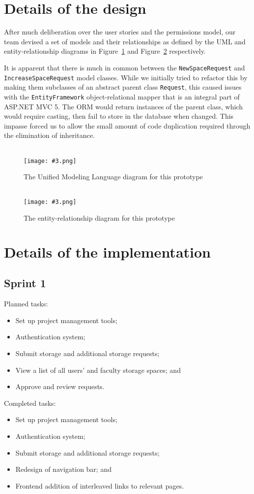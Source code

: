 \documentclass[a4paper,titlepage,12pt]{article}
\let\stdsection\section
\renewcommand\section{\newpage\stdsection}
\newcommand\figimg[4][\textwidth]{
	\begin{figure}
		\caption{#4}
		\label{fig:#2}
		\quad\\\texttt{[image: \#3.png]}
	\end{figure}
}
\begin{document}
\section{Details of the design}

After much deliberation over the user stories and the permissions model, our
team devised a set of models and their relationships as defined by the UML and
entity-relationship diagrams in Figure~\ref{fig:uml} and Figure~\ref{fig:erd}
respectively.

It is apparent that there is much in common between the
\texttt{NewSpaceRequest} and \texttt{IncreaseSpaceRequest} model classes. While
we initially tried to refactor this by making them subclasses of an abstract
parent class \texttt{Request}, this caused issues with the
\texttt{EntityFramework} object-relational mapper that is an integral part of
ASP.NET MVC 5. The ORM would return instances of the parent class, which would
require casting, then fail to store in the database when changed. This
impasse forced us to allow the small amount of code duplication required
through the elimination of inheritance.

\figimg{uml}{uml}{The Unified Modeling Language diagram for this prototype}

\figimg{erd}{erd}{The entity-relationship diagram for this prototype}

\section{Details of the implementation}

\subsection{Sprint 1}

Planned tasks:

\begin{itemize}
	\item Set up project management tools;
	\item Authentication system;
	\item Submit storage and additional storage requests;
	\item View a list of all users' and faculty storage spaces; and
	\item Approve and review requests.
\end{itemize}

Completed tasks:

\begin{itemize}
	\item Set up project management tools;
	\item Authentication system;
	\item Submit storage and additional storage requests;
	\item Redesign of navigation bar; and
	\item Frontend addition of interleaved links to relevant pages.
\end{itemize}
\end{document}
